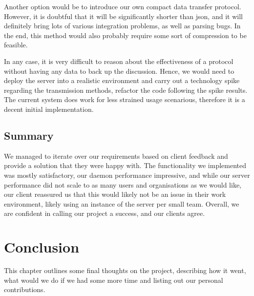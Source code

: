 \documentclass{l3proj}
\begin{document}
Another option would be to introduce our own compact data transfer protocol. However, it is doubtful that it will be significantly shorter than json, and it will definitely bring lots of various integration problems, as well as parsing bugs. In the end, this method would also probably require some sort of compression to be feasible.

In any case, it is very difficult to reason about the effectiveness of a protocol without having any data to back up the discussion. Hence, we would need to deploy the server into a realistic environment and carry out a technology spike regarding the transmission methods, refactor the code following the spike results. The current system does work for less strained usage scenarious, therefore it is a decent initial implementation.

\section{Summary}

We managed to iterate over our requirements based on client feedback and provide a solution that they were happy with. The functionality we implemented was mostly satisfactory, our daemon performance impressive, and while our server performance did not scale to as many users and organisations as we would like, our client reassured us that this would likely not be an issue in their work environment, likely using an instance of the server per small team. Overall, we are confident in calling our project a success, and our clients agree.



\chapter{Conclusion}

This chapter outlines some final thoughts on the project, describing how it went, what would we do if we had some more time and listing out our personal contributions.

\end{document}

